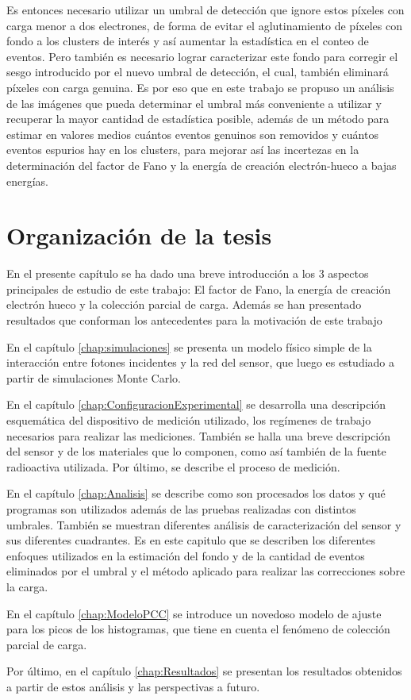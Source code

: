 Es entonces necesario utilizar un umbral de detección que ignore estos píxeles con carga menor a dos electrones, de forma de evitar el aglutinamiento de píxeles con fondo a los clusters de interés y así aumentar la estadística en el conteo de eventos. Pero también es necesario lograr caracterizar este fondo para corregir el sesgo introducido por el nuevo umbral de detección, el cual, también eliminará píxeles con carga genuina. Es por eso que en este trabajo se propuso un análisis de las imágenes que pueda determinar el umbral más conveniente a utilizar y recuperar la mayor cantidad de estadística posible, además de un método para estimar en valores medios cuántos eventos genuinos son removidos y cuántos eventos espurios hay en los clusters, para mejorar así las incertezas en la determinación del factor de Fano y la energía de creación electrón-hueco a bajas energías.
\section{Organización de la tesis}
\noindent En el presente capítulo se ha dado una breve introducción a los 3 aspectos principales de estudio de este trabajo: El factor de Fano, la energía de creación electrón hueco y la colección parcial de carga. Además se han presentado resultados que conforman los antecedentes para la motivación de este trabajo

En el capítulo \ref{chap:simulaciones} se presenta un modelo físico simple de la interacción entre fotones incidentes y la red del sensor, que luego es estudiado a partir de simulaciones Monte Carlo.

En el capítulo \ref{chap:ConfiguracionExperimental} se desarrolla una descripción esquemática del dispositivo de medición utilizado, los regímenes de trabajo necesarios para realizar las mediciones. También se halla una breve descripción del sensor y de los materiales que lo componen, como así también de la fuente radioactiva utilizada. Por último, se describe el proceso de medición.

En el capítulo \ref{chap:Analisis} se describe como son procesados los datos y qué programas son utilizados además de las pruebas realizadas con distintos umbrales. También se muestran diferentes análisis de caracterización del sensor y sus diferentes cuadrantes. Es en este capitulo que se describen los diferentes enfoques utilizados en la estimación del fondo y de la cantidad de eventos eliminados por el umbral y el método aplicado para realizar las correcciones sobre la carga.

En el capítulo \ref{chap:ModeloPCC} se introduce un novedoso modelo de ajuste para los picos de los histogramas, que tiene en cuenta el fenómeno de colección parcial de carga.

Por último, en el capítulo \ref{chap:Resultados} se presentan los resultados obtenidos a partir de estos análisis y las perspectivas a futuro.


